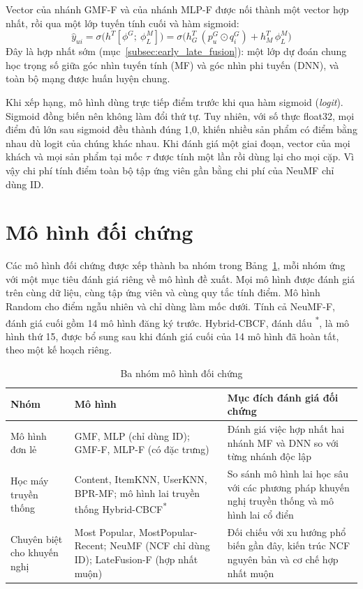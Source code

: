 Vector của nhánh GMF-F và của nhánh MLP-F được nối thành một vector hợp nhất, rồi qua một lớp tuyến tính cuối và hàm sigmoid:
\begin{equation*}
    \hat{y}_{ui} = \sigma\big(h^T [\phi^{G};\ \phi^M_L]\big) = \sigma\big(h_G^T\, (p^G_u \odot q^G_i) + h_M^T\, \phi^M_L\big)
\end{equation*}
Đây là hợp nhất sớm (mục~\ref{subsec:early_late_fusion}): một lớp dự đoán chung học trọng số giữa góc nhìn tuyến tính (MF) và góc nhìn phi tuyến (DNN), và toàn bộ mạng được huấn luyện chung.

Khi xếp hạng, mô hình dùng trực tiếp điểm trước khi qua hàm sigmoid (\textit{logit}). Sigmoid đồng biến nên không làm đổi thứ tự. Tuy nhiên, với số thực float32, mọi điểm đủ lớn sau sigmoid đều thành đúng 1,0, khiến nhiều sản phẩm có điểm bằng nhau dù logit của chúng khác nhau. Khi đánh giá một giai đoạn, vector của mọi khách và mọi sản phẩm tại mốc $\tau$ được tính một lần rồi dùng lại cho mọi cặp. Vì vậy chi phí tính điểm toàn bộ tập ứng viên gần bằng chi phí của NeuMF chỉ dùng ID.

\section{Mô hình đối chứng}
\label{sec:baselines}

Các mô hình đối chứng được xếp thành ba nhóm trong Bảng~\ref{tab:baseline_groups}, mỗi nhóm ứng với một mục tiêu đánh giá riêng về mô hình đề xuất. Mọi mô hình được đánh giá trên cùng dữ liệu, cùng tập ứng viên và cùng quy tắc tính điểm. Mô hình Random cho điểm ngẫu nhiên và chỉ dùng làm mốc dưới. Tính cả NeuMF-F, đánh giá cuối gồm 14 mô hình đăng ký trước. Hybrid-CBCF, đánh dấu \textsuperscript{*}, là mô hình thứ 15, được bổ sung sau khi đánh giá cuối của 14 mô hình đã hoàn tất, theo một kế hoạch riêng.

\begin{table}[H]
    \centering\small
    \caption{Ba nhóm mô hình đối chứng}
    \label{tab:baseline_groups}
    \begin{tabularx}{\textwidth}{|>{\raggedright\arraybackslash}p{3.3cm}|>{\raggedright\arraybackslash}p{4.2cm}|X|}
        \hline
        Nhóm & Mô hình & Mục đích đánh giá đối chứng \\
        \hline
        Mô hình đơn lẻ & GMF, MLP (chỉ dùng ID); GMF-F, MLP-F (có đặc trưng) & Đánh giá việc hợp nhất hai nhánh MF và DNN so với từng nhánh độc lập \\ \hline
        Học máy truyền thống & Content, ItemKNN, UserKNN, BPR-MF; mô hình lai truyền thống Hybrid-CBCF\textsuperscript{*} & So sánh mô hình lai học sâu với các phương pháp khuyến nghị truyền thống và mô hình lai cổ điển \\ \hline
        Chuyên biệt cho khuyến nghị & Most Popular, MostPopular-Recent; NeuMF (NCF chỉ dùng ID); LateFusion-F (hợp nhất muộn) & Đối chiếu với xu hướng phổ biến gần đây, kiến trúc NCF nguyên bản và cơ chế hợp nhất muộn \\
        \hline
    \end{tabularx}
\end{table}

